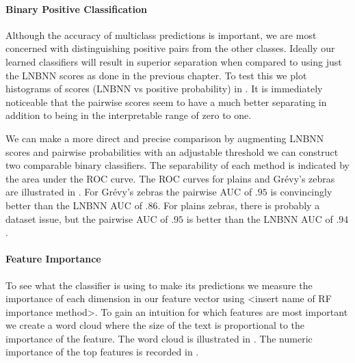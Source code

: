         \paragraph{Binary Positive Classification}
        Although the accuracy of multiclass predictions is important, we are
          most concerned with distinguishing positive pairs from the other
          classes.
        Ideally our learned classifiers will result in superior separation
          when compared to using just the LNBNN scores as done in the previous
          chapter.
        To test this we plot histograms of scores (LNBNN vs positive
          probability) in .
        It is immediately noticeable that the pairwise scores seem to have a
          much better separating in addition to being in the interpretable range
          of zero to one.


        \PositiveHist{}

        We can make a more direct and precise comparison by augmenting LNBNN
          scores and pairwise probabilities with an adjustable threshold we can
          construct two comparable binary classifiers.
        The separability of each method is indicated by the area under the ROC
          curve.
        The ROC curves for plains and Grévy's zebras are illustrated in
          .
        For Grévy's zebras the pairwise AUC of $.95$ is convincingly better
          than the LNBNN AUC of $.86$.
        For plains zebras, there is probably a dataset issue, but the pairwise
          AUC of $.95$ is better than the LNBNN AUC of $.94$.

        \PositiveROC{}


        \paragraph{Feature Importance}
        To see what the classifier is using to make its predictions we measure the
        importance of each dimension in our feature vector using <insert name of RF
        importance method>. To gain an intuition for which features are most important
        we create a word cloud where the size of the text is proportional to the
        importance of the feature. The word cloud is illustrated in
        . The numeric importance of the top features is
        recorded in .

